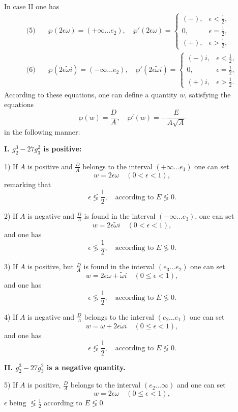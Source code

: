 \documentclass{article}
\begin{document}
In case II one has
\begin{align*}
\text{(5)} \quad & \wp(2\epsilon\omega) = (+\infty \ldots e_2), \quad
\wp'(2\epsilon\omega) = \begin{cases}
(-), & \epsilon < \frac{1}{2}, \\
0, & \epsilon = \frac{1}{2}, \\
(+), & \epsilon > \frac{1}{2},
\end{cases} \\
\text{(6)} \quad & \wp(2\epsilon\tilde{\omega}i) = (-\infty \ldots e_2), \quad
\wp'(2\epsilon\tilde{\omega}i) = \begin{cases}
(-)i, & \epsilon < \frac{1}{2}, \\
0, & \epsilon = \frac{1}{2}, \\
(+)i, & \epsilon > \frac{1}{2}.
\end{cases}
\end{align*}
According to these equations, one can define a quantity $w$, satisfying the equations
\[
\wp(w) = \frac{D}{A}, \quad \wp'(w) = -\frac{E}{A\sqrt{A}}
\]
in the following manner:

\textbf{I. $g_2^3 - 27g_3^2$ is positive:}

1) If $A$ is positive and $\frac{D}{A}$ belongs to the interval $(+\infty \ldots e_1)$ one can set
\[
w = 2\epsilon\omega \quad (0 < \epsilon < 1),
\]
remarking that
\[
\epsilon \lessgtr \frac{1}{2}, \quad \text{according to } E \lessgtr 0.
\]

2) If $A$ is negative and $\frac{D}{A}$ is found in the interval $(-\infty \ldots e_3)$, one can set
\[
w = 2\epsilon\tilde{\omega}i \quad (0 < \epsilon < 1),
\]
and one has
\[
\epsilon \lessgtr \frac{1}{2}, \quad \text{according to } E \lessgtr 0.
\]

3) If $A$ is positive, but $\frac{D}{A}$ is found in the interval $(e_3 \ldots e_2)$ one can set
\[
w = 2\epsilon\omega + \tilde{\omega}i \quad (0 \leq \epsilon < 1),
\]
and one has
\[
\epsilon \lessgtr \frac{1}{2}, \quad \text{according to } E \lessgtr 0.
\]

4) If $A$ is negative and $\frac{D}{A}$ belongs to the interval $(e_2 \ldots e_1)$ one can set
\[
w = \omega + 2\epsilon\tilde{\omega}i \quad (0 \leq \epsilon < 1),
\]
and one has
\[
\epsilon \lessgtr \frac{1}{2}, \quad \text{according to } E \lessgtr 0.
\]

\textbf{II. $g_2^3 - 27g_3^2$ is a negative quantity.}

5) If $A$ is positive, $\frac{D}{A}$ belongs to the interval $(e_2 \ldots \infty)$ and one can set
\[
w = 2\epsilon\omega \quad (0 \leq \epsilon < 1),
\]
$\epsilon$ being $\lessgtr \frac{1}{2}$ according to $E \lessgtr 0$.
\end{document}
